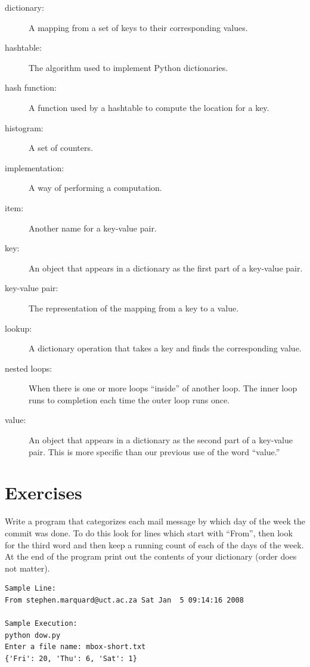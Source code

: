 \documentclass[10pt]{book}
\begin{document}
\begin{description}

\item[dictionary:] A mapping from a set of keys to their
corresponding values.

\item[hashtable:] The algorithm used to implement Python
dictionaries.

\item[hash function:] A function used by a hashtable to compute the
location for a key.

\item[histogram:] A set of counters.

\item[implementation:] A way of performing a computation.

\item[item:] Another name for a key-value pair.

\item[key:] An object that appears in a dictionary as the
first part of a key-value pair.

\item[key-value pair:] The representation of the mapping from
a key to a value.

\item[lookup:] A dictionary operation that takes a key and finds
the corresponding value.

\item[nested loops:] When there is one or more loops ``inside'' of 
another loop.  The inner loop runs to completion each time the outer
loop runs once.

\item[value:] An object that appears in a dictionary as the
second part of a key-value pair.  This is more specific than
our previous use of the word ``value.''

\end{description}

\section{Exercises}

\begin{ex}
Write a program that categorizes each mail message by which 
day of the week the commit was done. To do this look for 
lines which start with ``From'', then look for the 
third word and then keep a running count of each of the 
days of the week. At the end of the program print out the 
contents of your dictionary (order does not matter).

\beforeverb
\begin{verbatim}
Sample Line:
From stephen.marquard@uct.ac.za Sat Jan  5 09:14:16 2008

Sample Execution:
python dow.py
Enter a file name: mbox-short.txt
{'Fri': 20, 'Thu': 6, 'Sat': 1}
\end{verbatim}
\afterverb
\end{ex}
\end{document}
